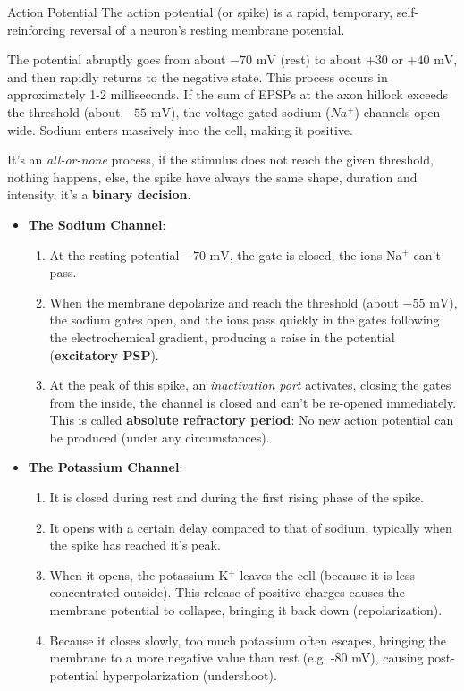 \documentclass[10pt, letterpaper]{report}
\begin{document}
\begin{boxdefinition}{Action Potential}{}
     The action potential (or spike) is a rapid, temporary, self-reinforcing reversal of a neuron's resting membrane potential.
\end{boxdefinition}
The potential abruptly goes from about $-70\text{ mV}$ (rest) to about $+30$ or $+40\text{ mV}$, and then rapidly returns to the negative state. This process occurs in approximately 1-2 milliseconds.
If the sum of EPSPs at the axon hillock exceeds the threshold (about $-55\text{ mV}$), the voltage-gated sodium ($Na^+$) channels open wide. Sodium enters massively into the cell, making it positive.\bigskip

It's an \textit{all-or-none} process, if the stimulus does not reach the given threshold, nothing happens, else, the spike have always the same shape, duration and intensity, it's a \textbf{binary decision}.\begin{itemize}
     \item \textbf{The Sodium Channel}:\begin{enumerate}
          \item At the resting potential $-70\text{ mV}$, the gate is closed, the ions Na$^+$ can't pass. 
          \item When the membrane depolarize and reach the threshold (about $-55\text{ mV}$), the sodium gates open, and the ions pass quickly in the gates following the electrochemical gradient, producing a raise in the  potential (\textbf{excitatory PSP}). 
          \item At the peak of this spike, an \textit{inactivation port} activates, closing the gates from the inside, the channel is closed and can't be re-opened immediately. This is called \textbf{absolute refractory period}: No
new action potential can be
produced (under any
circumstances).
     \end{enumerate}
     \item  \textbf{The Potassium Channel}:\begin{enumerate}
          \item It is closed during rest and during the first rising phase of the spike.
          \item It opens with a certain delay compared to that of sodium, typically when the spike has reached it's peak.
          \item When it opens, the potassium K$^+$ leaves the cell (because it is less concentrated outside). This release of positive charges causes the membrane potential to collapse, bringing it back down (repolarization).
          \item Because it closes slowly, too much potassium often escapes, bringing the membrane to a more negative value than rest (e.g. -80 mV), causing post-potential hyperpolarization (undershoot).
     \end{enumerate}
\end{itemize}
\end{document}
